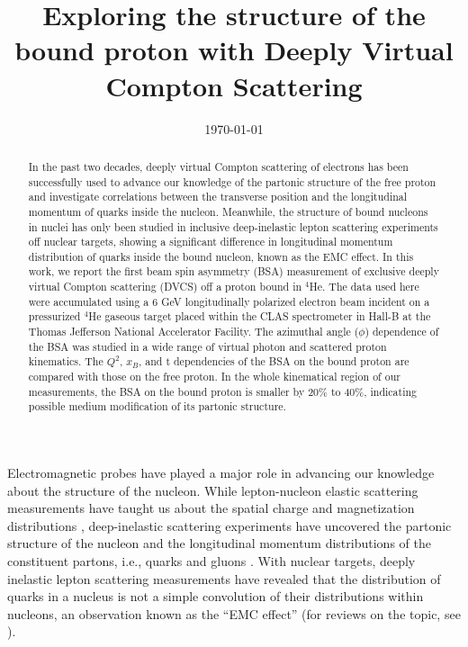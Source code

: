 \documentclass[twocolumn,nofootinbib,prl,superscriptaddress,secnumarabic,amssymb,nobibnotes,aps,floatfix]{revtex4}
\begin{document}

\title{Exploring the structure of the bound proton with Deeply Virtual Compton Scattering}



\date{\today}
\begin{abstract}
In the past two decades, deeply virtual Compton scattering of electrons has 
   been successfully used to advance our knowledge of the partonic structure of 
   the free proton and investigate correlations between the transverse position 
   and the longitudinal momentum of quarks inside the nucleon. Meanwhile, the 
   structure of bound nucleons in nuclei has only been studied in inclusive 
   deep-inelastic lepton scattering experiments off nuclear targets, showing a 
   significant difference in longitudinal momentum distribution of quarks 
   inside the bound nucleon, known as the EMC effect. In this work, we report the first beam spin asymmetry (BSA) 
   measurement of exclusive deeply virtual Compton scattering (DVCS) off a 
   proton bound in $^4$He.  The data used here were accumulated using a $6$ GeV 
   longitudinally polarized electron beam incident on
a pressurized $^4$He gaseous target placed within the CLAS spectrometer in Hall-B at the Thomas
Jefferson National Accelerator Facility. The azimuthal angle ($\phi$) dependence of the BSA was
studied in a wide range of virtual photon and scattered proton kinematics. The 
   $Q^2$, $x_B$,
and t dependencies of the BSA on the bound proton are compared with those on the free proton.
In the whole kinematical region of our measurements, the BSA on the bound proton is smaller by
20\% to 40\%, indicating possible medium modification of its partonic structure.
\end{abstract}

\maketitle 

Electromagnetic probes have played a major role in advancing our knowledge 
about the structure of the nucleon. While lepton-nucleon elastic scattering 
measurements have 
taught us about the spatial charge and magnetization distributions 
\cite{Hofstadter:1955ae,Perdrisat:2006hj}, deep-inelastic scattering 
experiments have uncovered the partonic structure of the nucleon and 
the longitudinal momentum distributions of the constituent partons, i.e., 
quarks and gluons \cite{pdg}.  With nuclear targets, deeply inelastic lepton 
scattering measurements have revealed that the distribution of quarks in a 
nucleus is not a simple convolution of their distributions within nucleons, an 
observation known as the ``EMC effect''\cite{EMC_first} (for reviews on the 
topic, see  \cite{Arneodo:1992wf,Geesaman:1995yd,Norton:2003cb,Hen:2016kwk}).
\end{document}
